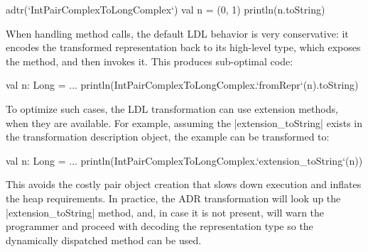 \begin{lstlisting-nobreak}
adtr(`IntPairComplexToLongComplex`) {
  val n = (0, 1)
  println(n.toString)
}
\end{lstlisting-nobreak}


When handling method calls, the default LDL behavior is very conservative: it encodes the transformed representation back to its high-level type, which exposes the method, and then invokes it. This produces sub-optimal code:

\begin{lstlisting-nobreak}
val n: Long = ...
println(IntPairComplexToLongComplex.`fromRepr`(n).toString)
\end{lstlisting-nobreak}

To optimize such cases, the LDL transformation can use extension
methods, when they are
available. For example, assuming the |extension_toString| exists in
the transformation description object, the example can be transformed
to:

\begin{lstlisting-nobreak}
val n: Long = ...
println(IntPairComplexToLongComplex.`extension_toString`(n))
\end{lstlisting-nobreak}

This avoids the costly pair object creation that slows down execution and inflates the heap requirements. In practice, the ADR transformation will look up the |extension_toString| method, and, in case it is not present, will warn the programmer and proceed with decoding the representation type so the dynamically dispatched method can be used.

